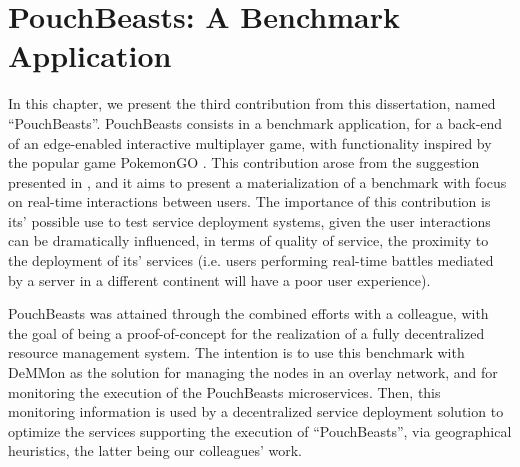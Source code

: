

\chapter{PouchBeasts: A Benchmark Application}
\label{cha:benchmark}

In this chapter, we present the third contribution from this dissertation, named ``PouchBeasts''. PouchBeasts consists in a benchmark application, for a back-end of an edge-enabled interactive multiplayer game, with functionality inspired by the popular game PokemonGO \cite{pokemonGo}. This contribution arose from the suggestion presented in \cite{Leitao2018}, and it aims to present a materialization of a benchmark with focus on real-time interactions between users. The importance of this contribution is its' possible use to test service deployment systems, given the user interactions can be dramatically influenced, in terms of quality of service, the proximity to the deployment of its' services (i.e. users performing real-time battles mediated by a server in a different continent will have a poor user experience).


PouchBeasts was attained through the combined efforts with a colleague, with the goal of being a proof-of-concept for the realization of a fully decentralized resource management system. The intention is to use this benchmark with DeMMon as the solution for managing the nodes in an overlay network, and for monitoring the execution of the PouchBeasts microservices. Then, this monitoring information is used by a decentralized service deployment solution to optimize the services supporting the execution of ``PouchBeasts'', via geographical heuristics, the latter being our colleagues' work.


